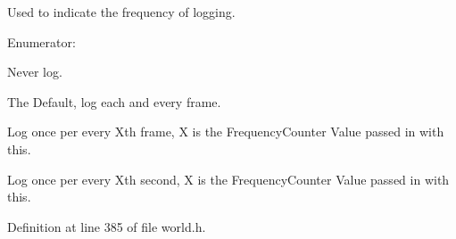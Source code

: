 Used to indicate the frequency of logging. 

\begin{Desc}
\item[Enumerator: ]\par
\begin{description}
\item[{\em 
\hypertarget{classMezzanine_1_1World_a535c832832bbdebcdc623c3472a32e25abf336536d5cf6396466067a847f64e3d}{
LogNever}
\label{classMezzanine_1_1World_a535c832832bbdebcdc623c3472a32e25abf336536d5cf6396466067a847f64e3d}
}]Never log. \item[{\em 
\hypertarget{classMezzanine_1_1World_a535c832832bbdebcdc623c3472a32e25ac1d6f9aa441fdc15961f28f18bbdbdb2}{
LogOncePerFrame}
\label{classMezzanine_1_1World_a535c832832bbdebcdc623c3472a32e25ac1d6f9aa441fdc15961f28f18bbdbdb2}
}]The Default, log each and every frame. \item[{\em 
\hypertarget{classMezzanine_1_1World_a535c832832bbdebcdc623c3472a32e25a1d4113b21efd91ab73056970906fafe5}{
LogOncePerXFrames}
\label{classMezzanine_1_1World_a535c832832bbdebcdc623c3472a32e25a1d4113b21efd91ab73056970906fafe5}
}]Log once per every Xth frame, X is the FrequencyCounter Value passed in with this. \item[{\em 
\hypertarget{classMezzanine_1_1World_a535c832832bbdebcdc623c3472a32e25adf1caf2c27e4c4e6178c13e8579ab872}{
LogOncePerXSeconds}
\label{classMezzanine_1_1World_a535c832832bbdebcdc623c3472a32e25adf1caf2c27e4c4e6178c13e8579ab872}
}]Log once per every Xth second, X is the FrequencyCounter Value passed in with this. \end{description}
\end{Desc}



Definition at line 385 of file world.h.



